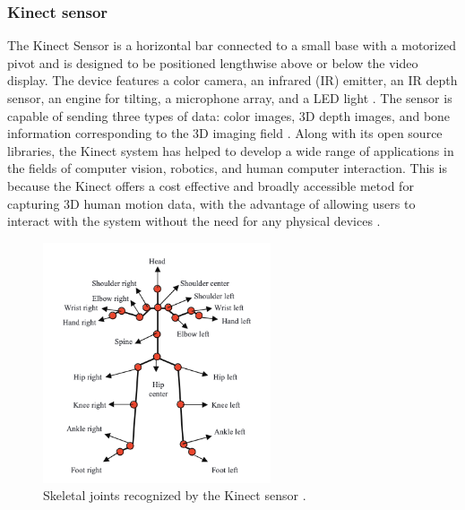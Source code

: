                     \subsubsection{Kinect sensor} 

                        The Kinect Sensor is a horizontal bar connected to a small base with a motorized pivot and is designed to be positioned lengthwise above or below the video display. The device features a color camera, an infrared (IR) emitter, an IR depth sensor, an engine for tilting, a microphone array, and a LED light \cite{abbasi_motion_2021}. The sensor is capable of sending three types of data: color images, 3D depth images, and bone information corresponding to the 3D imaging field \cite{zheng_cg-recognizer_2022}\cite{acis_classification_2023}. Along with its open source libraries, the Kinect system has helped to develop a wide range of applications in the fields of computer vision, robotics, and human computer interaction. This is because the Kinect offers a cost effective and broadly accessible metod for capturing 3D human motion data, with the advantage of allowing users to interact with the system without the need for any physical devices \cite{gowing_kinect_2014}.
                
                        \begin{figure}[H]
                            \centering
                            \includegraphics[width=0.6\textwidth]{./resources/images/kinect/joints.png}
                            \caption{Skeletal joints recognized by the Kinect sensor \cite{jais_review_2015}.}
                            \label{fig:kinect_sensor_v2}
                        \end{figure}

